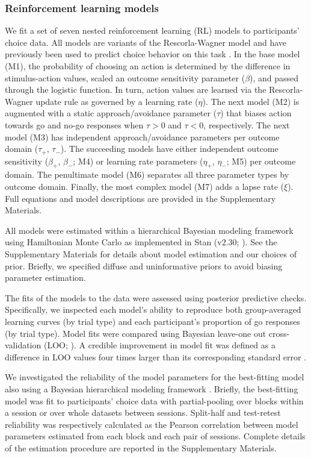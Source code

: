 \documentclass[a4paper,12pt]{article}
\begin{document}
\begin{refsection}[main]
\subsubsection*{Reinforcement learning models}

We fit a set of seven nested reinforcement learning (RL) models to participants' choice data. All models are variants of the Rescorla-Wagner model and have previously been used to predict choice behavior on this task \cite{guitart2012go, mkrtchian2017modeling, moutoussis2018change, swart2017catecholaminergic}. In the base model (M1), the probability of choosing an action is determined by the difference in stimulus-action values, scaled an outcome sensitivity parameter ($\beta$), and passed through the logistic function. In turn, action values are learned via the Rescorla-Wagner update rule as governed by a learning rate ($\eta$). The next model (M2) is augmented with a static approach/avoidance parameter ($\tau$) that biases action towards go and no-go responses when $\tau > 0$ and $\tau < 0$, respectively. The next model (M3) has independent approach/avoidance parameters per outcome domain ($\tau_+$, $\tau_-$). The succeeding models have either independent outcome sensitivity  ($\beta_+$, $\beta_-$; M4) or learning rate parameters ($\eta_+$, $\eta_-$; M5) per outcome domain. The penultimate model (M6) separates all three parameter types by outcome domain. Finally, the most complex model (M7) adds a lapse rate ($\xi$). Full equations and model descriptions are provided in the Supplementary Materials.

All models were estimated within a hierarchical Bayesian modeling framework using Hamiltonian Monte Carlo as implemented in Stan (v2.30; \cite{carpenter2017stan}). See the Supplementary Materials for details about model estimation and our choices of prior. Briefly, we specified diffuse and uninformative priors to avoid biasing parameter estimation.

The fits of the models to the data were assessed using posterior predictive checks. Specifically, we inspected each model's ability to reproduce both group-averaged learning curves (by trial type) and each participant's proportion of go responses (by trial type). Model fits were compared using Bayesian leave-one out cross-validation (LOO; \cite{vehtari2017practical}). A credible improvement in model fit was defined as a difference in LOO values four times larger than its corresponding standard error \cite{Vehtari_undated-tc}.

We investigated the reliability of the model parameters for the best-fitting model also using a Bayesian hierarchical modeling framework \cite{rouder2019psychometrics}. Briefly, the best-fitting model was fit to participants' choice data with partial-pooling over blocks within a session or over whole datasets between sessions. Split-half and test-retest reliability was respectively calculated as the Pearson correlation between model parameters estimated from each block and each pair of sessions. Complete details of the estimation procedure are reported in the Supplementary Materials.


\end{refsection}
\end{document}
